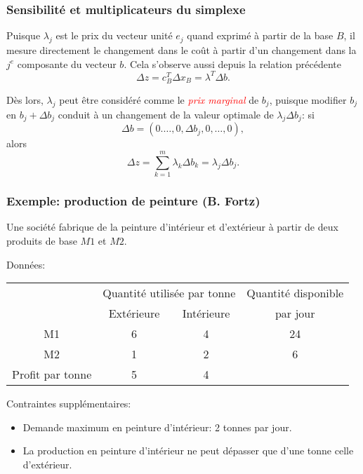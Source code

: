 \documentclass[usepdftitle=false]{beamer}
\begin{document}
\begin{frame}
	\frametitle{Sensibilité et multiplicateurs du simplexe}
	
	Puisque $\lambda_j$ est le prix du vecteur unité $e_j$ quand exprimé à partir de la base $B$, il mesure directement le changement dans le coût à partir d'un changement dans la $j^e$ composante du vecteur $b$. Cela s'observe aussi depuis la relation précédente
	\[
	\Delta z = c_B^T \Delta x_B = \lambda^T \Delta b.
	\]
	
	\mbox{}
	
	Dès lors, $\lambda_j$ peut être considéré comme le \textsl{\textcolor{red}{prix marginal}} de $b_j$, puisque modifier $b_j$ en $b_j + \Delta b_j$ conduit à un changement de la valeur optimale de $\lambda_j \Delta b_j$: si
	\[
	\Delta b = (0.\ldots,0,\Delta b_j,0,\ldots,0),
	\]
	alors
	\[
	\Delta z = \sum_{k=1}^m \lambda_k \Delta b_k = \lambda_j \Delta b_j.
	\]
	
\end{frame}

\begin{frame}
	\frametitle{Exemple: production de peinture (B. Fortz)}
	
	Une société fabrique de la peinture d'intérieur et d'extérieur à partir de deux
	produits de base $M1$ et $M2$.
	
	\mbox{}
	
	Données:
	\begin{tabular}{cccc}
		& \multicolumn{2}{c}{Quantité utilisée par tonne}
		& Quantité disponible \\
		& Extérieure & Intérieure &  par jour \\
		\hline
		M1 & 6 & 4 & 24 \\
		M2 & 1 & 2 & 6 \\
		\hline
		Profit par tonne & 5 & 4
	\end{tabular}
	
	\mbox{}
	
	Contraintes supplémentaires:
	\begin{itemize}
		\item
		Demande maximum en peinture d’intérieur: 2 tonnes par jour.
		\item
		La production en peinture d'intérieur ne peut dépasser que d’une tonne celle d'extérieur.
	\end{itemize}
	
\end{frame}
\end{document}
